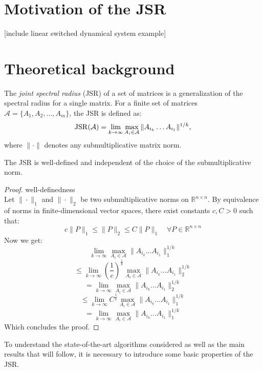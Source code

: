 \section{Motivation of the JSR}
[include linear switched dynamical system example]

\section{Theoretical background}

The \emph{joint spectral radius} (JSR) of a set of matrices is a generalization of the spectral radius for a single matrix. For a finite set of matrices $\mathcal{A} = \{A_1, A_2, \dots, A_m\}$, the JSR is defined as:
\begin{equation}
    \operatorname{JSR}(\mathcal{A}) = \lim_{k \to \infty} \max_{A_i \in \mathcal{A}} \|A_{i_k} \dots A_{i_1}\|^{1/k},
\end{equation}
where $\|\cdot\|$ denotes any submultiplicative matrix norm.

\begin{theorem}
    The JSR is well-defined and independent of the choice of the submultiplicative norm.
\end{theorem}

\begin{proof}{well-definedness\\}
Let $\| \cdot \|_1$   and $ \| \cdot \|_2 $ be two submultiplicative norms on $ \mathbb{R}^{n \times n} $. By equivalence of norms in finite-dimensional vector spaces, there exist constants $ c, C > 0 $ such that:
$$
c \|P\|_1 \leq \|P\|_2 \leq C \|P\|_1 \quad \forall P \in \mathbb{R}^{n \times n}
$$
Now we get: 
$$
\lim_{k \to \infty} \max_{A_i \in \mathcal{A}} \|A_{i_k} \dots A_{i_1}\|_{1}^{1/k} 
$$
$$
\le \lim_{k \to \infty} {(\frac{1}{c})}^{\frac{1}{k}} \max_{A_i \in \mathcal{A}} \|A_{i_k} \dots A_{i_1}\|_{2}^{1/k} 
$$
$$
= \lim_{k \to \infty} \max_{A_i \in \mathcal{A}} \|A_{i_k} \dots A_{i_1}\|_{2}^{1/k} 
$$
$$
\le \lim_{k \to \infty} {C}^{\frac{1}{k}} \max_{A_i \in \mathcal{A}} \|A_{i_k} \dots A_{i_1}\|_{1}^{1/k}
$$
$$
= \lim_{k \to \infty} \max_{A_i \in \mathcal{A}} \|A_{i_k} \dots A_{i_1}\|_{1}^{1/k}
$$
Which concludes the proof.
\end{proof}

To understand the state-of-the-art algorithms considered as well as the main results that will follow, it is necessary to introduce some basic properties of the JSR.

